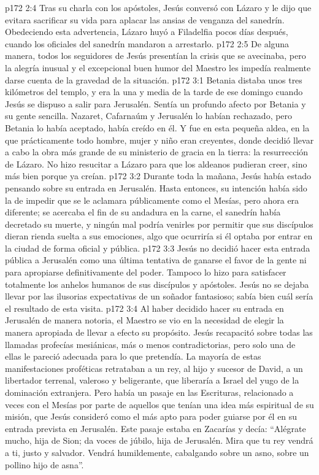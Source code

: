 \vs p172 2:4 Tras su charla con los apóstoles, Jesús conversó con Lázaro y le dijo que evitara sacrificar su vida para aplacar las ansias de venganza del sanedrín. Obedeciendo esta advertencia, Lázaro huyó a Filadelfia pocos días después, cuando los oficiales del sanedrín mandaron a arrestarlo.
\vs p172 2:5 De alguna manera, todos los seguidores de Jesús presentían la crisis que se avecinaba, pero la alegría inusual y el excepcional buen humor del Maestro les impedía realmente darse cuenta de la gravedad de la situación.
\vs p172 3:1 Betania distaba unos tres kilómetros del templo, y era la una y media de la tarde de ese domingo cuando Jesús se dispuso a salir para Jerusalén. Sentía un profundo afecto por Betania y su gente sencilla. Nazaret, Cafarnaúm y Jerusalén lo habían rechazado, pero Betania lo había aceptado, había creído en él. Y fue en esta pequeña aldea, en la que prácticamente todo hombre, mujer y niño eran creyentes, donde decidió llevar a cabo la obra más grande de su ministerio de gracia en la tierra: la resurrección de Lázaro. No hizo resucitar a Lázaro para que los aldeanos pudieran creer, sino más bien porque ya creían.
\vs p172 3:2 Durante toda la mañana, Jesús había estado pensando sobre su entrada en Jerusalén. Hasta entonces, su intención había sido la de impedir que se le aclamara públicamente como el Mesías, pero ahora era diferente; se acercaba el fin de su andadura en la carne, el sanedrín había decretado su muerte, y ningún mal podría venirles por permitir que sus discípulos dieran rienda suelta a sus emociones, algo que ocurriría si él optaba por entrar en la ciudad de forma oficial y pública.
\vs p172 3:3 Jesús no decidió hacer esta entrada pública a Jerusalén como una última tentativa de ganarse el favor de la gente ni para apropiarse definitivamente del poder. Tampoco lo hizo para satisfacer totalmente los anhelos humanos de sus discípulos y apóstoles. Jesús no se dejaba llevar por las ilusorias expectativas de un soñador fantasioso; sabía bien cuál sería el resultado de esta visita.
\vs p172 3:4 Al haber decidido hacer su entrada en Jerusalén de manera notoria, el Maestro se vio en la necesidad de elegir la manera apropiada de llevar a efecto su propósito. Jesús recapacitó sobre todas las llamadas profecías mesiánicas, más o menos contradictorias, pero solo una de ellas le pareció adecuada para lo que pretendía. La mayoría de estas manifestaciones proféticas retrataban a un rey, al hijo y sucesor de David, a un libertador terrenal, valeroso y beligerante, que liberaría a Israel del yugo de la dominación extranjera. Pero había un pasaje en las Escrituras, relacionado a veces con el Mesías por parte de aquellos que tenían una idea más espiritual de su misión, que Jesús consideró como el más apto para poder guiarse por él en su entrada prevista en Jerusalén. Este pasaje estaba en Zacarías y decía: “Alégrate mucho, hija de Sion; da voces de júbilo, hija de Jerusalén. Mira que tu rey vendrá a ti, justo y salvador. Vendrá humildemente, cabalgando sobre un asno, sobre un pollino hijo de asna”.
